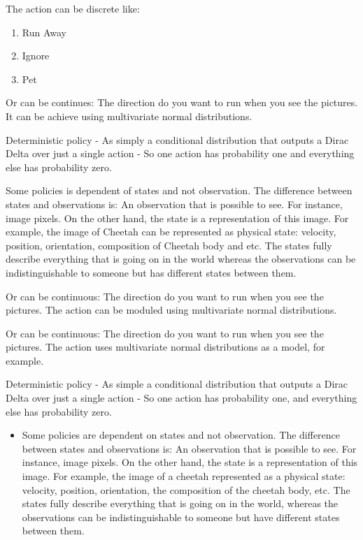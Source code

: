 \documentclass[]{article}
\begin{document}
\par The action can be discrete like:
\begin{enumerate}
    \item Run Away
    \item Ignore
    \item Pet
\end{enumerate}
\par Or can be continues: The direction do you want to run when you see the pictures. It can be achieve using
multivariate normal distributions. 
\par  Deterministic policy - As simply a conditional distribution that  outputs a Dirac Delta over just a single action
- So one action has probability one and everything else has probability zero.
\par Some policies is dependent of states and not observation.  The difference between states and observations is: An
observation that is possible to see. For instance, image pixels. On the other hand, the state is a representation of
this image. For example, the image of Cheetah can be represented as physical state: velocity, position, orientation,
composition of Cheetah body and etc. The states fully describe everything that is going on in the world whereas the
observations can be indistinguishable to someone but has different states between them. 

\par Or can be continuous: The direction do you want to run when you see the pictures. The action can be moduled using multivariate normal distributions.

\par Or can be continuous: The direction do you want to run when you see the pictures. The action uses multivariate normal distributions as a model, for example.

\par Deterministic policy - As simple a conditional distribution that outputs a Dirac Delta over just a single action - So one action has probability one, and everything else has probability zero.
\par 
\begin{itemize}
    \item Some policies are dependent on states and not observation. The difference between states and observations is: 
        An observation that is possible to see. For instance, image pixels. On the other hand, the state is a representation of this image. For example, the image of a cheetah represented as a physical state: velocity, position, orientation, the composition of the cheetah body, etc. The states fully describe everything that is going on in the world, whereas the observations can be indistinguishable to someone but have different states between them.
\end{itemize}
\end{document}
